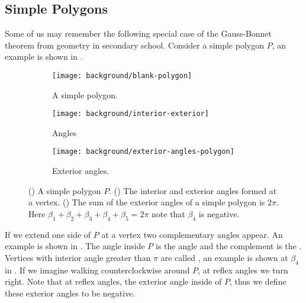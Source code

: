 \subsection{Simple Polygons}
\label{sec:warm-up}

Some of us may remember the following special case
of the Gauss-Bonnet theorem from geometry in secondary school.
Consider a simple polygon $P$, an example is shown in .

 \begin{figure}[htb]
         \centering
          \begin{subfigure}[b]{0.30\textwidth}
      		   \texttt{[image: background/blank-polygon]}
    		    \caption{A simple polygon.}
 		 \label{fig:polygon}
	 \end{subfigure}
	 \hspace{.5cm}
	 \begin{subfigure}[b]{0.25\textwidth}
       		  \texttt{[image: background/interior-exterior]}
     		    \caption{Angles}
 		 \label{fig:interior-exterior}
       \end{subfigure}
        \hspace{.5cm}
     \begin{subfigure}[b]{0.27\textwidth}
       		  \texttt{[image: background/exterior-angles-polygon]}
       		  \caption{Exterior angles.}
       		   \label{fig:exterior-angles}
         \end{subfigure}
		\caption{() A simple polygon $P.$
		() The interior and exterior angles formed at a vertex.
 		 () The sum of the exterior angles of a simple
		polygon is $2\pi$. Here
		$\beta_1+\beta_2+\beta_3+\beta_4+\beta_5=2\pi$ note that $\beta_4$ is negative.
 		\label{fig:simple-polygon}}
 \end{figure}

If we extend one side of $P$ at a vertex two complementary angles appear.
An example is shown in .
The angle inside $P$ is the  angle and the complement 
is the  . 
Vertices with interior angle greater than $\pi$ are called ,
an example is shown at $\beta_4$ in .
If we imagine walking counterclockwise around $P$, at reflex angles we turn right.
Note that at reflex angles, the exterior angle inside of $P$, thus we define
these exterior angles to be negative. 


